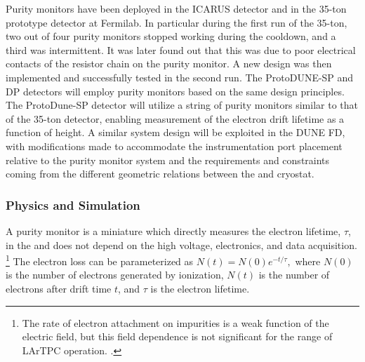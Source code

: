 Purity monitors have been deployed in the ICARUS detector and in the 35-ton prototype detector at Fermilab. In particular during the first run of the 35-ton, two out of four purity monitors stopped working during the cooldown, and a third was intermittent. It was later found out that this was due to poor electrical contacts of the resistor chain on the purity monitor. A new design was then implemented and successfully tested in the second run. 
The ProtoDUNE-SP and DP detectors will employ purity monitors based on the same design principles. The ProtoDune-SP detector will utilize a string of purity monitors similar to that of the 35-ton detector, enabling measurement of the electron drift lifetime as a function of height.  A similar system design will be exploited in the DUNE FD, with modifications made to accommodate the instrumentation port placement relative to the purity monitor system and the requirements and constraints coming from the different geometric relations between the  and cryostat. 

\subsubsection{Physics and Simulation}

A purity monitor is a miniature  which directly measures the electron lifetime, $\tau$, in the  and does not depend on the   high voltage, electronics, and data acquisition.%
\footnote{The rate of electron attachment on impurities is a weak function of
the electric field, but this field dependence is not significant for the range of LArTPC operation.%
\cite{docdb-4482}.}%
The electron loss can be parameterized as
%
\(N(t) = N(0)e^{-t/\tau},\)
%
where $N(0)$ is the number of electrons generated by ionization, $N(t)$ is the number of electrons after drift time $t$, and $\tau$ is the electron lifetime. 

